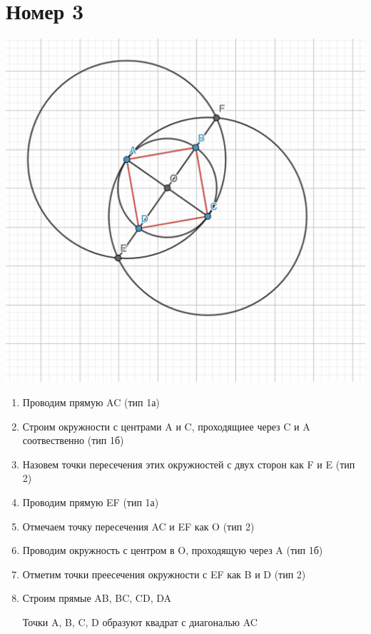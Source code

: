 \documentclass[a4paper,12pt]{article}
\author{Бурмашев Григорий, БПМИ-208}
\title{}
\date{\today}
\begin{document}
\section*{Номер 3}
\begin{center}
\includegraphics[scale=0.4]{3.png}
\end{center}
\begin{enumerate}
\item Проводим прямую AC (тип 1а)
\item Строим окружности с центрами A и C, проходящиее через C и A соотвественно (тип 1б)
\item Назовем точки пересечения этих окружностей с двух сторон как F и E (тип 2)
\item Проводим прямую EF (тип 1а)

\item Отмечаем точку пересечения AC и EF как O (тип 2)

\item Проводим окружность с центром в O, проходящую через A (тип 1б)
\item Отметим точки преесечения окружности с EF как B и D (тип 2)
\item Строим прямые AB, BC, CD, DA

Точки A, B, C, D образуют квадрат с диагональю AC
\end{enumerate}
\end{document}
